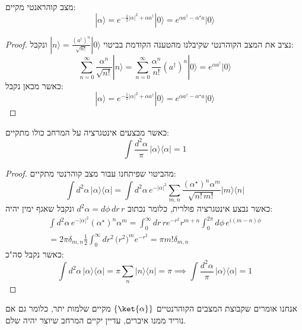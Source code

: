 \documentclass{tstextbook}
\begin{document}
\begin{proposition}
מצב קוהראנטי מקיים:
$$|\alpha\rangle=e^{-{\frac{1}{2}}|\alpha|^{2}+\alpha a^{\dagger}}|0\rangle=e^{\alpha a^{\dagger}-\alpha^{\star}a}|0\rangle$$

\end{proposition}
\begin{proof}
נציב את המצב הקוהרנטי שקיבלנו מהטענה הקודמת בביטוי \(|n\rangle=\frac{(a^{\dagger})^{n}}{\sqrt{n!}}|0\rangle\) ונקבל:
$$\sum_{n=0}^{\infty}\frac{\alpha^{n}}{\sqrt{n!}}|n\rangle=\sum_{n=0}^{\infty}\frac{\alpha^{n}}{n!}(a^{\dagger})^{n}|0\rangle=e^{\alpha a^{\dagger}}|0\rangle$$
כאשר מכאן נקבל:
$$|\alpha\rangle=e^{-\frac12|\alpha|^{2}+\alpha a^{\dagger}}|0\rangle=e^{\alpha a^{\dagger}-\alpha^{\star}a}|0\rangle$$

\end{proof}
\begin{proposition}
כאשר מבצעים אינטגרציה על המרחב כולו מתקיים:
$$\int\frac{d^{2}\alpha}{\pi}\,|\alpha\rangle\langle\alpha|=1$$

\end{proposition}
\begin{proof}
מהביטוי שפיתחנו עבור מצב קוהרנטי מתקיים:
$$\int d^{2}\alpha\,|\alpha\rangle\langle\alpha|=\int d^{2}\alpha\,e^{-|\alpha|^{2}}\sum_{m,n}\frac{(\alpha^{\star})^{n}\alpha^{m}}{\sqrt{n!\,m!}}|m\rangle\langle n|$$
כאשר נבצע אינטגרציה פולרית, כלומר נכתוב \(d^{2}\alpha=d\phi\,d r\,r\) ונקבל שאגף ימין יהיה:
$$\begin{array}{c}{{\displaystyle{\int d^{2}\alpha\,e^{-\left|\alpha\right|^{2}}(\alpha^{\star})^{n}\alpha^{m}=\int_{0}^{\infty}d r\,r e^{-r^{2}}r^{m+n}\int_{0}^{2\pi}d\phi\,e^{i(m-n)\phi}}}}\\ {{{=2\pi\delta_{m,n}\displaystyle{\frac{1}{2}}\int_{0}^{\infty}d r^{2}\,\bigl(r^{2}\bigr)^{m}e^{-r^{2}}=\pi m!\delta_{m,n}}}}\end{array}$$
כאשר נקבל סה"כ:
$$\int d^{2}\alpha\,|\alpha\rangle\langle\alpha|=\pi\sum_{n}|n\rangle\langle n|=\pi \implies \int\frac{d^{2}\alpha}{\pi}\,|\alpha\rangle\langle\alpha|=1$$

\end{proof}
אנחנו אומרים שקבוצת המצבים הקוהרנטיים \(\left\{  \ket{\alpha}  \right\}\) מקיים שלמות יתר, כלומר גם אם נוריד ממנו איברים, עדיין יקיים המרחב שיוצר יהיה שלם.
\end{document}
